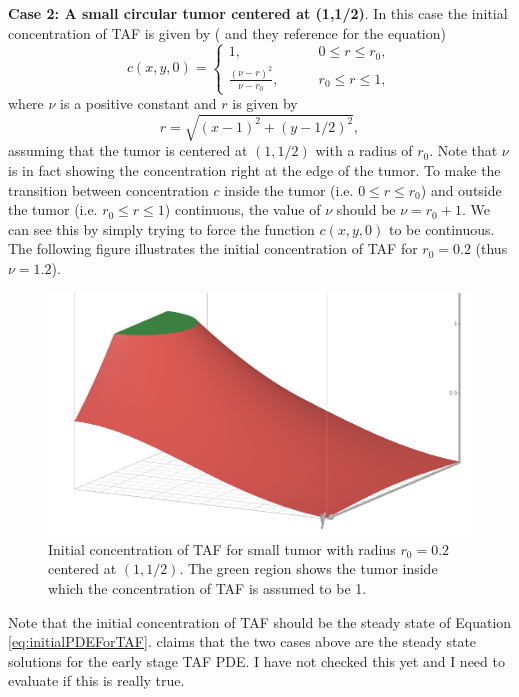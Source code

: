 \textbf{Case 2: A small circular tumor centered at (1,1/2)}. In this case the initial concentration of TAF is given by (\cite{Anderson1998} and they reference \cite{Chaplain1995,Chaplain1996} for the equation)
\[ c(x,y,0) = \begin{cases}
	1, &\qquad 0\leq r\leq r_0, \\
	\frac{(\nu - r)^2}{\nu - r_0}, &\qquad r_0 \leq r \leq 1,
\end{cases} \]
where $ \nu $ is a positive constant and $ r $ is given by
\[ r = \sqrt{(x-1)^{2} + (y-1/2)^2}, \]
assuming that the tumor is centered at $ (1,1/2) $ with a radius of $ r_0 $. Note that $ \nu $ is in fact showing the concentration right at the edge of the tumor. To make the transition between concentration $ c $ inside the tumor (i.e. $ 0 \leq r \leq r_0 $) and outside the tumor (i.e. $ r_0 \leq r \leq 1 $) continuous, the value of $ \nu $ should be $ \boxed{\nu = r_0 + 1} $. We can see this by simply trying to force the function $ c(x,y,0) $ to be continuous. The following figure illustrates the initial concentration of TAF for $ r_0 = 0.2 $ (thus $ \nu = 1.2 $).
\begin{figure}[!ht]
	\centering
	\includegraphics[width=0.5\linewidth]{images/TAFInitialConcentrationSmallTumor}
	\caption{Initial concentration of TAF for small tumor with radius $ r_0 = 0.2 $ centered at $ (1,1/2) $. The green region shows the tumor inside which the concentration of TAF is assumed to be 1.}
	\label{fig:initialConcentrationOfTAFSmallTumor}
\end{figure}


\begin{beCareful}
	Note that the initial concentration of TAF should be the steady state of Equation \autoref{eq:initialPDEForTAF}. \cite{Anderson1998} claims that the two cases above are the steady state solutions for the early stage TAF PDE. I have not checked this yet and I need to evaluate if this is really true.
\end{beCareful}


